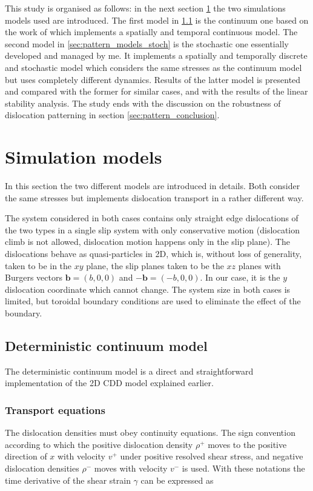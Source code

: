 This study is organised as follows: in the next section \ref{sec:pattern_models} the two simulations models used are introduced. The first model in \ref{sec:pattern_models_det} is the continuum one based on the work of \citet{PhysRevB.93.214110} which implements a spatially and temporal continuous model. The second model in \ref{sec:pattern_models_stoch} is the stochastic one essentially developed and managed by me. It implements a spatially and temporally discrete and stochastic model which considers the same stresses as the continuum model but uses completely different dynamics. Results of the latter model is presented and compared with the former for similar cases, and with the results of the linear stability analysis. The study ends with the discussion on the robustness of dislocation patterning in section \ref{sec:pattern_conclusion}.

\section{Simulation models} \label{sec:pattern_models}
In this section the two different models are introduced in details. Both consider the same stresses but implements dislocation transport in a rather different way.

The system considered in both cases contains only straight edge dislocations of the two types in a single slip system with only conservative motion (dislocation climb is not allowed, dislocation motion happens only in the slip plane). The dislocations behave as quasi-particles in 2D, which is, without loss of generality, taken to be in the $xy$ plane, the slip planes taken to be the $xz$ planes with Burgers vectors ${\mathbf{b}} = \left( {b,0,0} \right)$ and $-{\mathbf{b}} = \left( {-b,0,0} \right)$. In our case, it is the $y$ dislocation coordinate which cannot change. The system size in both cases is limited, but toroidal boundary conditions are used to eliminate the effect of the boundary.


\subsection{Deterministic continuum model} \label{sec:pattern_models_det}
The deterministic continuum model is a direct and straightforward implementation of the 2D CDD model\cite{Groma_2003_AM,valdenaire2016density,PhysRevB.93.214110} explained earlier.

\subsubsection{Transport equations} \label{sec:pattern_hydro}
The dislocation densities must obey continuity equations. The sign convention according to which the positive dislocation density ${\rho ^ + }$ moves to the positive direction of $x$ with velocity ${v^ + }$ under positive resolved shear stress, and negative dislocation densities ${\rho ^ - }$ moves with velocity ${v^ - }$ is used. With these notations the time derivative of the shear strain $\gamma$ can be expressed as 

